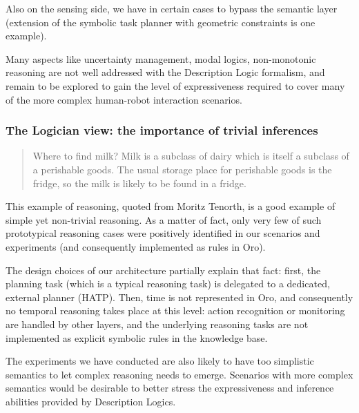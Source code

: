 \documentclass[letterpaper, 10 pt, conference]{ieeeconf}  %
\begin{document}
Also on the sensing side, we have in certain cases to bypass the semantic layer
(extension of the symbolic task planner with geometric constraints is one
example).

Many aspects like uncertainty management, modal logics,
non-monotonic reasoning are not well addressed with the Description Logic
formalism, and remain to be explored to gain the level of expressiveness
required to cover many of the more complex human-robot interaction scenarios.

\subsubsection{The Logician view: the importance of trivial inferences}

\begin{quote}

    Where to find milk? Milk is a subclass of dairy which is itself a subclass
    of a perishable goods. The usual storage place for perishable goods is the
    fridge, so the milk is likely to be found in a fridge.

\end{quote}

This example of reasoning, quoted from Moritz Tenorth, is a good example of
simple yet non-trivial reasoning. As a matter of fact, only very few of such
prototypical reasoning cases were positively identified in our scenarios and experiments
(and consequently implemented as rules in {\sc Oro}).

The design choices of our architecture partially explain that fact: first, the
planning task (which is a typical reasoning task) is delegated to a
dedicated, external planner (HATP). Then, time is not represented in {\sc Oro}, and
consequently no temporal reasoning takes place at this level: action
recognition or monitoring are handled by other layers, and the underlying
reasoning tasks are not implemented as explicit symbolic rules in the knowledge
base.

The experiments we have conducted are also likely to have too simplistic
semantics to let complex reasoning needs to emerge. Scenarios with more complex
semantics would be desirable to better stress the expressiveness and inference
abilities provided by Description Logics.
\end{document}
